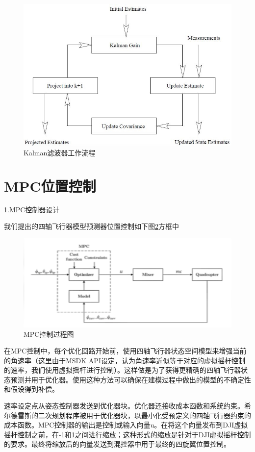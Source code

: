 \begin{figure}[ht]
  \centering
  \includegraphics[width=0.8\linewidth]{./Figure/Kalman_Filter_Code_Process.jpeg}
  \caption{Kalman滤波器工作流程}\label{Fig:img9}
\end{figure}

\section{MPC位置控制}

1.MPC控制器设计

我们提出的四轴飞行器模型预测器位置控制如下图\ref{Fig:img10}方框中

\begin{figure}[ht]
  \centering
  \includegraphics[width=0.8\linewidth]{./Figure/MPC-Diagram.png}
  \caption{MPC控制过程图}\label{Fig:img10}
\end{figure}

在MPC控制中，每个优化回路开始前，使用四轴飞行器状态空间模型来增强当前的角速率（这里由于MSDK API设定，认为角速率近似等于对应的虚拟摇杆控制的速率，我们使用虚拟摇杆进行控制）。这样做是为了获得更精确的四轴飞行器状态预测并用于优化器。使用这种方法可以确保在建模过程中做出的模型的不确定性和假设得到补偿\cite{ArtE1}。

速率设定点从姿态控制器发送到优化器块。优化器还接收成本函数和系统约束。希尔德雷斯的二次规划程序被用于优化器块，以最小化受预定义的四轴飞行器约束的成本函数。MPC控制器的输出是控制或输入向量u。在将这个向量发布到DJI虚拟摇杆控制之前，在-1和1之间进行缩放；这种形式的缩放是针对于DJI虚拟摇杆控制的要求。最终将缩放后的向量发送到混控器中用于最终的四旋翼位置控制\cite{ArtE9}。

